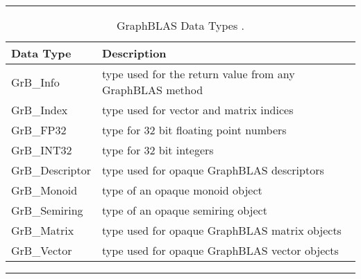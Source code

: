 \begin{table}[h]
\hrule
\begin{center}
\caption{GraphBLAS Data Types .}
\label{Tab:GrBdataTypes}
\begin{tabular}{ll}
Data Type               & Description  \\
\hline
GrB\_Info             & type used for the return value from any GraphBLAS method \\
GrB\_Index          & type used for vector and matrix indices \\
GrB\_FP32          & type for 32 bit floating point numbers \\
GrB\_INT32         & type for 32 bit integers \\
GrB\_Descriptor   & type used for opaque GraphBLAS descriptors \\
GrB\_Monoid       & type of an opaque monoid object  \\
GrB\_Semiring     & type of an opaque semiring object  \\
GrB\_Matrix         & type used for opaque GraphBLAS matrix objects \\
GrB\_Vector         & type used for opaque GraphBLAS vector objects \\
\end{tabular}
\end{center}
\hrule
\end{table}



